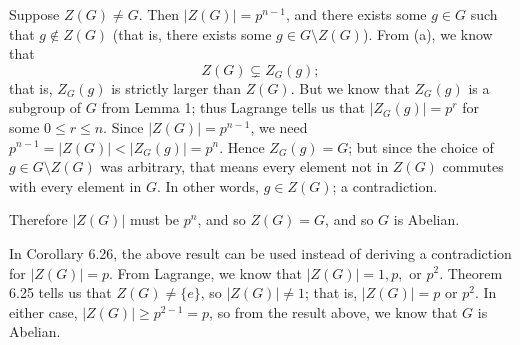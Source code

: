\documentclass{homework}
\begin{document}
\begin{solution}
\begin{enumerate}[label=(\alph*)]
      Suppose $Z(G)\neq G$. Then $\left| Z(G) \right| =p^{n-1}$, and there exists some $g\in G$ such
      that $g\not\in Z(G)$ (that is, there exists some $g\in G\setminus Z(G)$). From (a), we know
      that \[
        Z(G)\subsetneq Z_G(g)
      ;\] that is, $Z_G(g)$ is strictly larger than $Z(G)$. But we know that $Z_G(g)$ is a subgroup
      of $G$ from Lemma 1; thus Lagrange tells us that $\left| Z_G(g) \right| =p^r$ for some $0\le
      r\le n$.  Since $\left| Z(G) \right| =p^{n-1}$, we need $p^{n-1}=\left| Z(G) \right|<\left|
      Z_G(g) \right| =p^{n}$. Hence $Z_G(g)=G$; but since the choice of $g\in G\setminus Z(G)$ was
      arbitrary, that means every element not in $Z(G)$ commutes with every element in $G$. In other
      words, $g\in Z(G)$; a contradiction. 

      Therefore $\left| Z(G) \right| $ must be $p^{n}$, and so $Z(G)=G$, and so $G$ is Abelian.
  \end{enumerate}

  In Corollary 6.26, the above result can be used instead of deriving a contradiction for $\left|
  Z(G) \right| =p$. From Lagrange, we know that $\left| Z(G) \right| =1,p,$ or $p^2$. Theorem 6.25
  tells us that $Z(G)\neq \{ e \}$, so $\left| Z(G) \right| \neq 1$; that is, $\left| Z(G) \right|
  =p$ or $p^2$. In either case, $\left| Z(G) \right| \ge p^{2-1}=p$, so from the result above, we
  know that $G$ is Abelian.
\end{solution}
\end{document}
